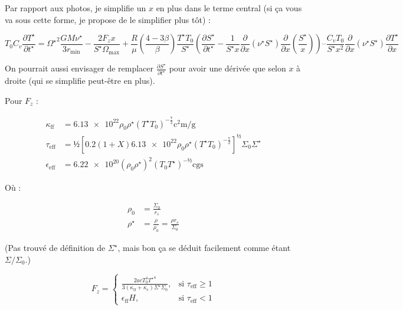 Par rapport aux photos, je simplifie un $x$ en plus dans le terme central (si ça vous va sous cette forme, je propose de le simplifier plus tôt) :

\begin{equation}
    T_0 C_v \frac{\partial T^{\star}}{\partial t^{\star}} =
    {\Omega^\star}^2 \frac{G M \nu^\star}{3 r_\mathrm{min}} − \frac{2 F_z x}{S^\star \Omega_\mathrm{max}} +
    \frac{R}{\mu} \left(\frac{4−3\beta}{\beta}\right) \frac{T^\star T_0}{S^\star}
    \left( \frac{\partial S^\star}{\partial t^\star} − \frac{1}{S^\star x} \frac{\partial}{\partial x} \left(\nu^\star S^\star\right) \frac{\partial}{\partial x} \left(\frac{S^\star}{x}\right) \right) –
    \frac{C_v T_0}{S^\star x^2} \frac{\partial}{\partial x} \left(\nu^\star S^\star\right) \frac{\partial T^\star}{\partial x}
\end{equation}

On pourrait aussi envisager de remplacer $\frac{\partial S^\star}{\partial t^\star}$ pour avoir une dérivée que selon $x$ à droite (qui se simplifie peut-être en plus).

Pour $F_z$ :

\begin{align}
    \kappa_\mathrm{ff} &= \num{6.13e22} \rho_0 \rho^\star \left(T^\star T_0\right)^{-\frac{7}{2}} \si{\square\centi\meter\per\gram} \\
    \tau_\mathrm{eff} &= ½ \left[ \num{0.2} (1+X) \num{6.13e22} \rho_0 \rho^\star \left(T^\star T_0\right)^{-\frac{7}{2}} \right]^½ \Sigma_0 \Sigma^\star \\
    \epsilon_\mathrm{eff} &= \num{6.22e20} (\rho_0 \rho^\star)^2 (T_0 T^\star)^{-½} \text{cgs}
\end{align}

Où :

\begin{align}
    \rho_0 &= \frac{\Sigma_0}{r_s} \\
    \rho^\star &= \frac{\rho}{\rho_0} = \frac{\rho r_s}{\Sigma_0}
\end{align}

(Pas trouvé de définition de $\Sigma^\star$, mais bon ça se déduit facilement comme étant $\Sigma/\Sigma_0$.)

\begin{equation}
    F_z =
    \begin{cases}
        \frac{2 a c T_0^4 {T^\star}^4}{3 (\kappa_\mathrm{ff} + \kappa_e)\Sigma^\star \Sigma_0}, &\text{si $\tau_\mathrm{eff} \geq 1$} \\
        \epsilon_\mathrm{ff} H, &\text{si $\tau_\mathrm{eff} < 1$}
    \end{cases}
\end{equation}

